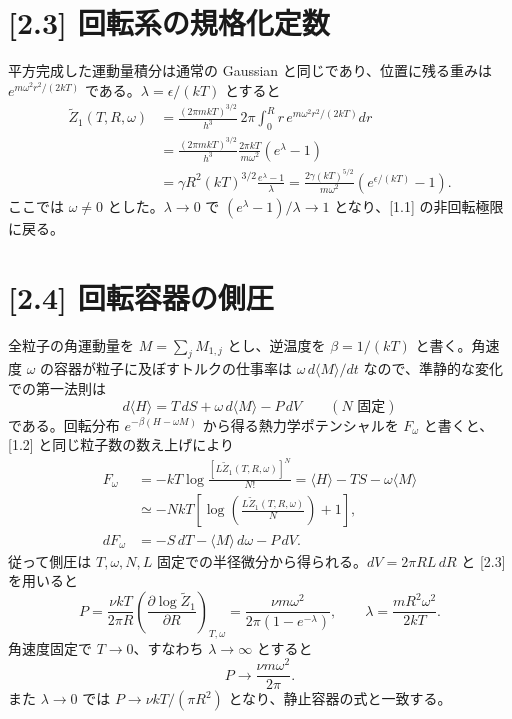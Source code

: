 \documentclass[11pt,a4paper]{article}
\begin{document}
\section*{[2.3] 回転系の規格化定数}
平方完成した運動量積分は通常の Gaussian と同じであり、位置に残る重みは $e^{m\omega^2r^2/(2kT)}$ である。$\lambda=\epsilon/(kT)$ とすると
\begin{align*}
\widetilde Z_1(T,R,\omega)
&=\frac{(2\pi mkT)^{3/2}}{h^3}\,2\pi\int_0^Rr\,e^{m\omega^2r^2/(2kT)}dr\\
&=\frac{(2\pi mkT)^{3/2}}{h^3}\frac{2\pi kT}{m\omega^2}(e^\lambda-1)\\
&=\boxed{\gamma R^2(kT)^{3/2}\frac{e^\lambda-1}{\lambda}}
=\boxed{\frac{2\gamma(kT)^{5/2}}{m\omega^2}(e^{\epsilon/(kT)}-1)}.
\end{align*}
ここでは $\omega\ne0$ とした。$\lambda\to0$ で $(e^\lambda-1)/\lambda\to1$ となり、[1.1] の非回転極限に戻る。

\section*{[2.4] 回転容器の側圧}
全粒子の角運動量を $M=\sum_jM_{1,j}$ とし、逆温度を $\beta=1/(kT)$ と書く。角速度 $\omega$ の容器が粒子に及ぼすトルクの仕事率は $\omega\,d\langle M\rangle/dt$ なので、準静的な変化での第一法則は
\[
 d\langle H\rangle=T\,dS+\omega\,d\langle M\rangle-P\,dV
 \qquad(N\text{ 固定})
\]
である。回転分布 $e^{-\beta(H-\omega M)}$ から得る熱力学ポテンシャルを $F_\omega$ と書くと、[1.2] と同じ粒子数の数え上げにより
\begin{align*}
 F_\omega&=-kT\log\frac{[L\widetilde Z_1(T,R,\omega)]^N}{N!}
 =\langle H\rangle-TS-\omega\langle M\rangle\\
 &\simeq-NkT\left[\log\left(\frac{L\widetilde Z_1(T,R,\omega)}N\right)+1\right],\\
 dF_\omega&=-S\,dT-\langle M\rangle\,d\omega-P\,dV.
\end{align*}
従って側圧は $T,\omega,N,L$ 固定での半径微分から得られる。$dV=2\pi RL\,dR$ と [2.3] を用いると
\[
P=\frac{\nu kT}{2\pi R}\left(\frac{\partial\log\widetilde Z_1}{\partial R}\right)_{T,\omega}
=\boxed{\frac{\nu m\omega^2}{2\pi(1-e^{-\lambda})}},\qquad \lambda=\frac{mR^2\omega^2}{2kT}.
\]
角速度固定で $T\to0$、すなわち $\lambda\to\infty$ とすると
\[
\boxed{P\longrightarrow\frac{\nu m\omega^2}{2\pi}}.
\]
また $\lambda\to0$ では $P\to\nu kT/(\pi R^2)$ となり、静止容器の式と一致する。
\end{document}
